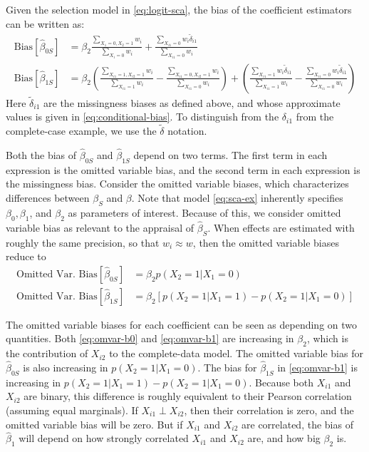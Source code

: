\documentclass[
]{article}
\begin{document}
Given the selection model in \eqref{eq:logit-sca}, the bias of the coefficient estimators can be written as:
\begin{align}
\text{Bias}[\hat{\beta}_{0S}]
  & = \beta_2 \frac{\sum_{X_1 = 0, X_2 = 1} w_i}{\sum_{X_i = 0} w_i} + \frac{\sum_{X_{i1} = 0} w_i \tilde{\delta}_{i1}}{\sum_{X_{i1} = 0} w_i}  \\
\text{Bias}[\hat{\beta}_{1S}]
  & = \beta_2 \left(\frac{\sum_{X_{i1} = 1, X_{i2} = 1} w_i}{\sum_{X_{i1} = 1} w_i} - \frac{\sum_{X_{i1} = 0, X_{i2} = 1} w_i}{\sum_{X_{i1} = 0} w_i}\right) + \left(\frac{\sum_{X_{i1} = 1} w_i \tilde{\delta}_{i1}}{\sum_{X_{i1} = 1} w_i} - \frac{\sum_{X_{i1} = 0} w_i \tilde{\delta}_{i1}}{\sum_{X_{i1} = 0} w_i}\right)
\end{align}
Here \(\tilde{\delta}_{i1}\) are the missingness biases as defined above, and whose approximate values is given in \eqref{eq:conditional-bias}.
To distinguish from the \(\delta_{i1}\) from the complete-case example, we use the \(\tilde{\delta}\) notation.

Both the bias of \(\hat{\beta}_{0S}\) and \(\hat{\beta}_{1S}\) depend on two terms.
The first term in each expression is the omitted variable bias, and the second term in each expression is the missingness bias.
Consider the omitted variable biases, which characterizes differences between \(\beta_S\) and \(\beta\).
Note that model \eqref{eq:sca-ex} inherently specifies \(\beta_0, \beta_1\), and \(\beta_2\) as parameters of interest.
Because of this, we consider omitted variable bias as relevant to the appraisal of \(\hat{\beta}_S\).
When effects are estimated with roughly the same precision, so that \(w_i \approx w\), then the omitted variable biases reduce to
\begin{align}
\text{Omitted Var. Bias}[\hat{\beta}_{0S}]
  & = \beta_2 p(X_2 = 1 | X_1 = 0) \label{eq:omvar-b0}\\
\text{Omitted Var. Bias}[\hat{\beta}_{1S}]
  & = \beta_2 \left[p(X_2 = 1 | X_1 = 1) - p(X_2 = 1 | X_1 = 0) \right] \label{eq:omvar-b1}
\end{align}

The omitted variable biases for each coefficient can be seen as depending on two quantities.
Both \eqref{eq:omvar-b0} and \eqref{eq:omvar-b1} are increasing in \(\beta_2\), which is the contribution of \(X_{i2}\) to the complete-data model.
The omitted variable bias for \(\hat{\beta}_{0S}\) is also increasing in \(p(X_2 = 1 | X_1 = 0)\).
The bias for \(\hat{\beta}_{1S}\) in \eqref{eq:omvar-b1} is increasing in \(p(X_2 = 1 | X_1 = 1) - p(X_2 = 1 | X_1 = 0)\).
Because both \(X_{i1}\) and \(X_{i2}\) are binary, this difference is roughly equivalent to their Pearson correlation (assuming equal marginals).
If \(X_{i1} \perp X_{i2}\), then their correlation is zero, and the omitted variable bias will be zero.
But if \(X_{i1}\) and \(X_{i2}\) are correlated, the bias of \(\hat{\beta}_1\) will depend on how strongly correlated \(X_{i1}\) and \(X_{i2}\) are, and how big \(\beta_2\) is.
\end{document}
